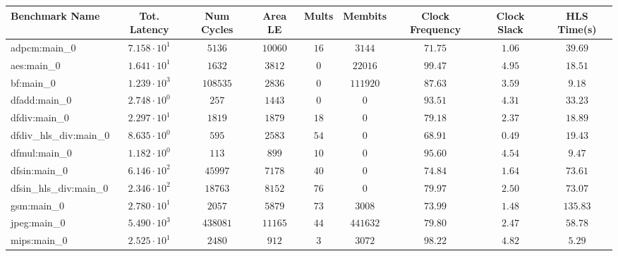 \begin{tabular}{|l|c|c|c|c|c|c|c|c|}
\hline
Benchmark Name          & Tot. Latency           & Num Cycles & Area LE   & Mults   & Membits    & Clock Frequency & Clock Slack & HLS Time(s) \\
\hline
adpcm:main\_0           & $ 7.158 \cdot 10^{1} $ & $ 5136   $ & $ 10060 $ & $ 16  $ & $ 3144   $ & $ 71.75       $ & $ 1.06    $ & $ 39.69   $ \\
aes:main\_0             & $ 1.641 \cdot 10^{1} $ & $ 1632   $ & $ 3812  $ & $ 0   $ & $ 22016  $ & $ 99.47       $ & $ 4.95    $ & $ 18.51   $ \\
bf:main\_0              & $ 1.239 \cdot 10^{3} $ & $ 108535 $ & $ 2836  $ & $ 0   $ & $ 111920 $ & $ 87.63       $ & $ 3.59    $ & $ 9.18    $ \\
dfadd:main\_0           & $ 2.748 \cdot 10^{0} $ & $ 257    $ & $ 1443  $ & $ 0   $ & $ 0      $ & $ 93.51       $ & $ 4.31    $ & $ 33.23   $ \\
dfdiv:main\_0           & $ 2.297 \cdot 10^{1} $ & $ 1819   $ & $ 1879  $ & $ 18  $ & $ 0      $ & $ 79.18       $ & $ 2.37    $ & $ 18.89   $ \\
dfdiv\_hls\_div:main\_0 & $ 8.635 \cdot 10^{0} $ & $ 595    $ & $ 2583  $ & $ 54  $ & $ 0      $ & $ 68.91       $ & $ 0.49    $ & $ 19.43   $ \\
dfmul:main\_0           & $ 1.182 \cdot 10^{0} $ & $ 113    $ & $ 899   $ & $ 10  $ & $ 0      $ & $ 95.60       $ & $ 4.54    $ & $ 9.47    $ \\
dfsin:main\_0           & $ 6.146 \cdot 10^{2} $ & $ 45997  $ & $ 7178  $ & $ 40  $ & $ 0      $ & $ 74.84       $ & $ 1.64    $ & $ 73.61   $ \\
dfsin\_hls\_div:main\_0 & $ 2.346 \cdot 10^{2} $ & $ 18763  $ & $ 8152  $ & $ 76  $ & $ 0      $ & $ 79.97       $ & $ 2.50    $ & $ 73.07   $ \\
gsm:main\_0             & $ 2.780 \cdot 10^{1} $ & $ 2057   $ & $ 5879  $ & $ 73  $ & $ 3008   $ & $ 73.99       $ & $ 1.48    $ & $ 135.83  $ \\
jpeg:main\_0            & $ 5.490 \cdot 10^{3} $ & $ 438081 $ & $ 11165 $ & $ 44  $ & $ 441632 $ & $ 79.80       $ & $ 2.47    $ & $ 58.78   $ \\
mips:main\_0            & $ 2.525 \cdot 10^{1} $ & $ 2480   $ & $ 912   $ & $ 3   $ & $ 3072   $ & $ 98.22       $ & $ 4.82    $ & $ 5.29    $ \\

\end{tabular}

